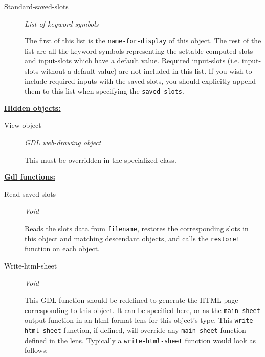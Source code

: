 \documentclass [11pt]{book}
\begin{document}
\begin{itemize}
\begin{description}
\item [Standard-saved-slots]
\emph{List of keyword symbols}

 The first of this list is the \texttt{name-for-display} of this object. The rest of the list
are all the keyword symbols representing the settable computed-slots and input-slots which have a default value. Required
input-slots (i.e. input-slots without a default value) are not included in this list. If you wish to include required
inputs with the saved-slots, you should explicitly append them to this list when specifying the \texttt{saved-slots}.




\end{description}






\textbf{
\underline{Hidden objects:}}

\begin{description}

\item [View-object]
\emph{GDL web-drawing object}

 This must be overridden in the specialized class.




\end{description}






\textbf{
\underline{Gdl functions:}}

\begin{description}

\item [Read-saved-slots]
\emph{Void}

 Reads the slots data from \texttt{filename}, restores the corresponding slots in this
object and matching descendant objects, and calls the \texttt{restore!} function on each object.





\item [Write-html-sheet]
\emph{Void}

 This GDL function should be redefined to generate the HTML page corresponding to this object.
It can be specified here, or as the \texttt{main-sheet} output-function in an html-format lens for this
object's type. This \texttt{write-html-sheet} function, if defined,  will override any \texttt{main-sheet}
function defined in the lens. Typically a \texttt{write-html-sheet} function would look as follows:





\end{description}
\end{itemize}
\end{document}
